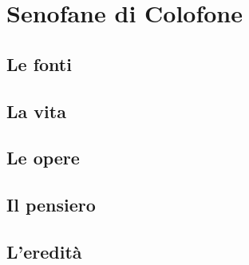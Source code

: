 \chapter{Senofane di Colofone}

\section{Le fonti}

\section{La vita}

\section{Le opere}

\section{Il pensiero}

\section{L'eredità}
